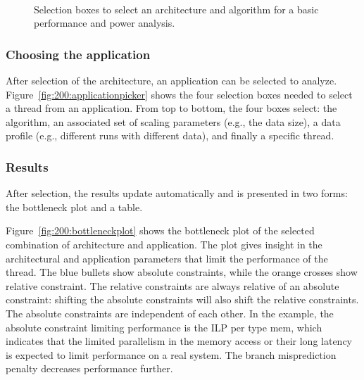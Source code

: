 \begin{figure}
  \centering
 	\\
	\caption{Selection boxes to select an architecture and algorithm for a basic performance and power analysis.}
	\label{fig:200:architectureapplicationpicker}
\end{figure}

\subsubsection{Choosing the application}

After selection of the architecture, an application can be selected to analyze. Figure~\ref{fig:200:applicationpicker} shows the four selection boxes needed to select a thread from an application. From top to bottom, the four boxes select: the algorithm, an associated set of scaling parameters (e.g., the data size), a data profile (e.g., different runs with different data), and finally a specific thread.

\subsubsection{Results}

After selection, the results update automatically and is presented in two forms: the bottleneck plot and a table.

Figure~\ref{fig:200:bottleneckplot} shows the bottleneck plot of the selected combination of architecture and application. The plot gives insight in the architectural and application parameters that limit the performance of the thread. The blue bullets show absolute constraints, while the orange crosses show relative constraint. The relative constraints are always relative of an absolute constraint: shifting the absolute constraints will also shift the relative constraints. The absolute constraints are independent of each other. In the example, the absolute constraint limiting performance is the ILP per type mem, which indicates that the limited parallelism in the memory access or their long latency is expected to limit performance on a real system. The branch misprediction penalty decreases performance further.

